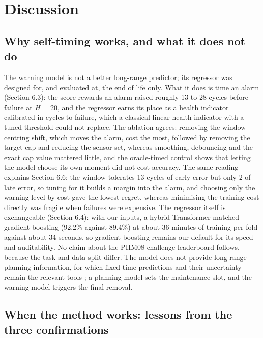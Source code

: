 \documentclass[a4paper,fleqn,doubleblind]{cas-dc}
\begin{document}
\section{Discussion}\label{sec:7}

\subsection{Why self-timing works, and what it does not do}

The warning model is not a better long-range predictor; its regressor was designed for, and evaluated at, the end of life only. What it does is time an alarm (Section 6.3): the score rewards an alarm raised roughly 13 to 28 cycles before failure at \textit{H} = 20, and the regressor earns its place as a health indicator calibrated in cycles to failure, which a classical linear health indicator with a tuned threshold could not replace. The ablation agrees: removing the window-centring shift, which moves the alarm, cost the most, followed by removing the target cap and reducing the sensor set, whereas smoothing, debouncing and the exact cap value mattered little, and the oracle-timed control shows that letting the model choose its own moment did not cost accuracy. The same reading explains Section 6.6: the window tolerates 13 cycles of early error but only 2 of late error, so tuning for it builds a margin into the alarm, and choosing only the warning level by cost gave the lowest regret, whereas minimising the training cost directly was fragile when failures were expensive. The regressor itself is exchangeable (Section 6.4): with our inputs, a hybrid Transformer matched gradient boosting (92.2\% against 89.4\%) at about 36 minutes of training per fold against about 34 seconds, so gradient boosting remains our default for its speed and auditability. No claim about the PHM08 challenge leaderboard follows, because the task and data split differ. The model does not provide long-range planning information, for which fixed-time predictions and their uncertainty remain the relevant tools \cite{kamariotis2024,mitici2023}; a planning model sets the maintenance slot, and the warning model triggers the final removal.

\subsection{When the method works: lessons from the three confirmations}
\end{document}
